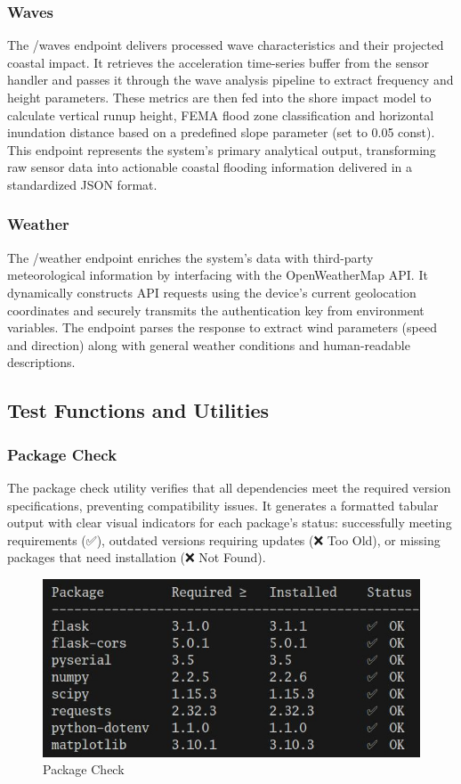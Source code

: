 \documentclass{article}
\begin{document}
    \subsubsection{Waves}
    The /waves endpoint delivers processed wave characteristics and their projected coastal impact. It retrieves the acceleration time-series buffer from the sensor handler and passes it through the wave analysis pipeline to extract frequency and height parameters. These metrics are then fed into the shore impact model to calculate vertical runup height, FEMA flood zone classification and horizontal inundation distance based on a predefined slope parameter (set to 0.05 const). This endpoint represents the system's primary analytical output, transforming raw sensor data into actionable coastal flooding information delivered in a standardized JSON format.

    \subsubsection{Weather}
    The /weather endpoint enriches the system's data with third-party meteorological information by interfacing with the OpenWeatherMap API. It dynamically constructs API requests using the device's current geolocation coordinates and securely transmits the authentication key from environment variables. The endpoint parses the response to extract wind parameters (speed and direction) along with general weather conditions and human-readable descriptions.

\subsection{Test Functions and Utilities}
    \subsubsection{Package Check}
    The package check utility verifies that all dependencies meet the required version specifications, preventing compatibility issues. It generates a formatted tabular output with clear visual indicators for each package's status: successfully meeting requirements (✅), outdated versions requiring updates (❌ Too Old), or missing packages that need installation (❌ Not Found).
    
    \begin{figure} [h]
        \centering
        \includegraphics[width=0.5\linewidth]{assets/check-packages.png}
        \caption{Package Check}
        \label{fig:enter-label}
    \end{figure}
    
\end{document}
